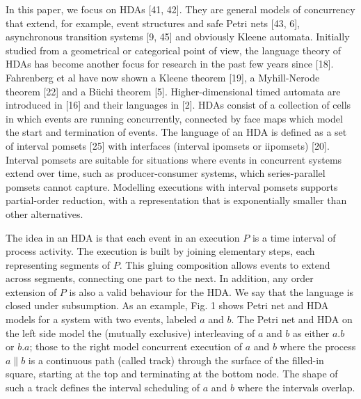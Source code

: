 \documentclass[10pt,a4paper]{article}
\begin{document}
 
 
In this paper, we focus on HDAs [41, 42]. They are general models of concurrency that extend, for example, event structures and safe Petri nets [43, 6], asynchronous transition systems [9, 45] and obviously Kleene automata. Initially studied from a geometrical or categorical point of view, the language theory of HDAs has become another focus for research in the past few years since [18]. Fahrenberg et al have now shown a Kleene theorem [19], a Myhill-Nerode theorem [22] and a Büchi theorem [5]. Higher-dimensional timed automata are introduced in [16] and their languages in [2]. HDAs consist of a collection of cells in which events are running concurrently, connected by face maps which model the start and termination of events. The language of an HDA is defined as a set of interval pomsets [25] with interfaces (interval ipomsets or iipomsets) [20]. Interval pomsets are suitable for situations where events in concurrent systems extend over time, such as producer-consumer systems, which series-parallel pomsets cannot capture. Modelling executions with interval pomsets supports partial-order reduction, with a representation that is exponentially smaller than other alternatives.\par
 
 
 
The idea in an HDA is that each event in an execution $P$ is a time interval of process activity. The execution is built by joining elementary steps, each representing segments of $P$. This gluing composition allows events to extend across segments, connecting one part to the next. In addition, any order extension of $P$ is also a valid behaviour for the HDA. We say that the language is closed under subsumption. As an example, Fig. 1 shows Petri net and HDA models for a system with two events, labeled $a$ and $b$. The Petri net and HDA on the left side model the (mutually exclusive) interleaving of $a$ and $b$ as either $a.b$ or $b.a$; those to the right model concurrent execution of $a$ and $b$ where the process $a\parallel b$ is a continuous path (called track) through the surface of the filled-in square, starting at the top and terminating at the bottom node. The shape of such a track defines the interval scheduling of $a$ and $b$ where the intervals overlap.\par
 
 
\end{document}

